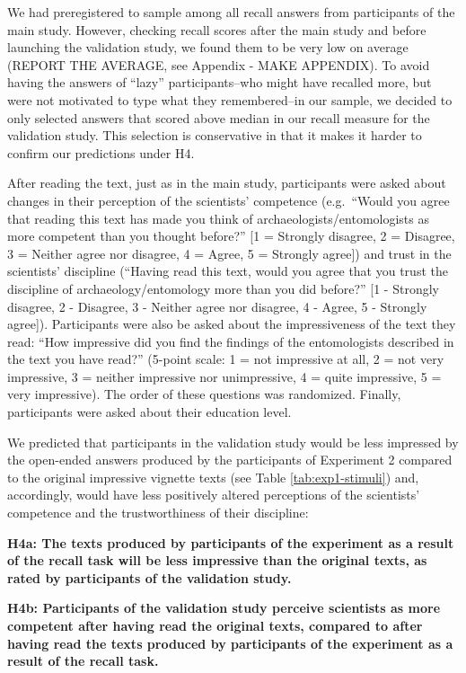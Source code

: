 \documentclass[
  doc,floatsintext]{apa6}
\begin{document}
We had preregistered to sample among all recall answers from participants of the main study. However, checking recall scores after the main study and before launching the validation study, we found them to be very low on average (REPORT THE AVERAGE, see Appendix - MAKE APPENDIX). To avoid having the answers of ``lazy'' participants--who might have recalled more, but were not motivated to type what they remembered--in our sample, we decided to only selected answers that scored above median in our recall measure for the validation study. This selection is conservative in that it makes it harder to confirm our predictions under H4.

After reading the text, just as in the main study, participants were asked about changes in their perception of the scientists' competence (e.g.~``Would you agree that reading this text has made you think of archaeologists/entomologists as more competent than you thought before?'' {[}1 = Strongly disagree, 2 = Disagree, 3 = Neither agree nor disagree, 4 = Agree, 5 = Strongly agree{]}) and trust in the scientists' discipline (``Having read this text, would you agree that you trust the discipline of archaeology/entomology more than you did before?'' {[}1 - Strongly disagree, 2 - Disagree, 3 - Neither agree nor disagree, 4 - Agree, 5 - Strongly agree{]}). Participants were also be asked about the impressiveness of the text they read: ``How impressive did you find the findings of the entomologists described in the text you have read?'' (5-point scale: 1 = not impressive at all, 2 = not very impressive, 3 = neither impressive nor unimpressive, 4 = quite impressive, 5 = very impressive). The order of these questions was randomized. Finally, participants were asked about their education level.

We predicted that participants in the validation study would be less impressed by the open-ended answers produced by the participants of Experiment 2 compared to the original impressive vignette texts (see Table \ref{tab:exp1-stimuli}) and, accordingly, would have less positively altered perceptions of the scientists' competence and the trustworthiness of their discipline:

\textbf{H4a: The texts produced by participants of the experiment as a result of the recall task will be less impressive than the original texts, as rated by participants of the validation study.}

\textbf{H4b: Participants of the validation study perceive scientists as more competent after having read the original texts, compared to after having read the texts produced by participants of the experiment as a result of the recall task.}
\end{document}
